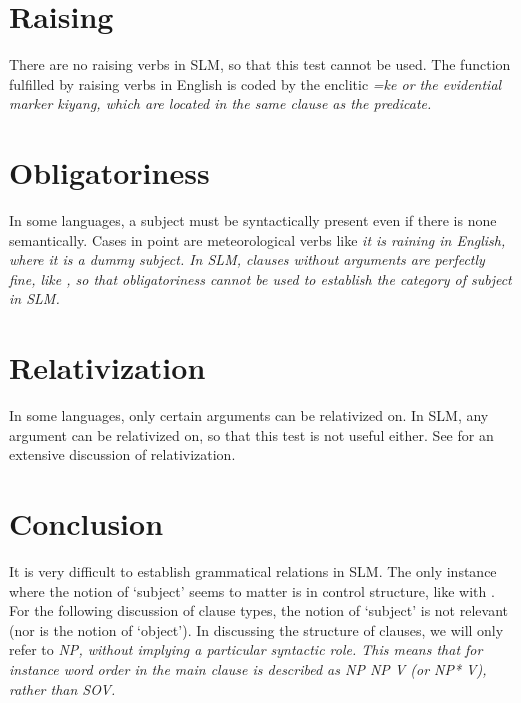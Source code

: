 \section{Raising}\label{sec:grel:Raising}
There are no raising verbs in SLM, so that this test cannot be used. The function fulfilled by raising verbs in English is coded by the enclitic \em =ke \em or the evidential marker \em kiyang\em, which are located in the same clause as the predicate.

\section{Obligatoriness}\label{sec:grel:Obligatoriness}
In some languages, a subject must be syntactically present even if there is none semantically. Cases in point are meteorological verbs like \em it is raining \em in English, where \em it \em is a dummy subject. In SLM, clauses without arguments are perfectly fine, like , so that obligatoriness cannot be used to establish the category of subject in SLM.

\section{Relativization}\label{sec:grel:Relativization}
In some languages, only certain arguments can be relativized on. In SLM, any argument can be relativized on, so that this test is not useful either. See  for an extensive discussion of relativization.

\section{Conclusion}\label{sec:grel:Conclusion}
It is very difficult to establish grammatical relations in SLM. The only instance where the notion of `subject' seems to matter is in control structure, like with . For the following discussion of clause types, the notion of `subject' is not relevant (nor is the notion of `object'). In discussing the structure of clauses, we will only refer to \em NP\em, without implying a particular syntactic role. This means that for instance word order in the main clause is described as \em NP NP V \em (or \em NP* V\em), rather than \em SOV\em.


 

% 
 
